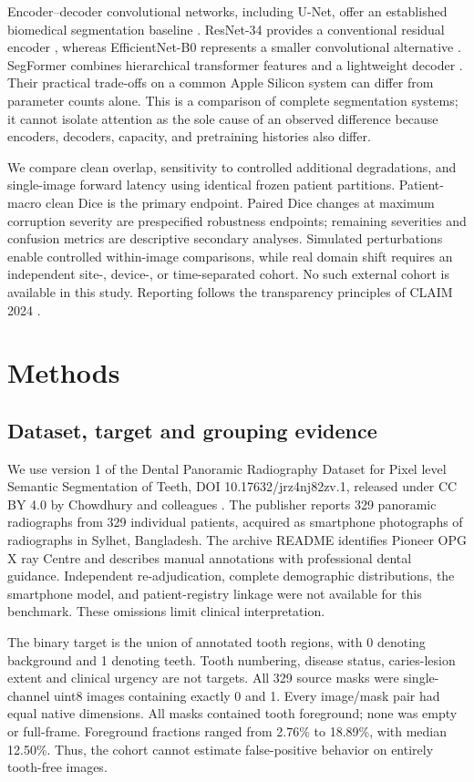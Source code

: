\documentclass[11pt]{article}
\begin{document}
Encoder--decoder convolutional networks, including U-Net, offer an established biomedical segmentation baseline \cite{unet}. ResNet-34 provides a conventional residual encoder \cite{resnet}, whereas EfficientNet-B0 represents a smaller convolutional alternative \cite{efficientnet}. SegFormer combines hierarchical transformer features and a lightweight decoder \cite{segformer}. Their practical trade-offs on a common Apple Silicon system can differ from parameter counts alone. This is a comparison of complete segmentation systems; it cannot isolate attention as the sole cause of an observed difference because encoders, decoders, capacity, and pretraining histories also differ.

We compare clean overlap, sensitivity to controlled additional degradations, and single-image forward latency using identical frozen patient partitions. Patient-macro clean Dice is the primary endpoint. Paired Dice changes at maximum corruption severity are prespecified robustness endpoints; remaining severities and confusion metrics are descriptive secondary analyses. Simulated perturbations enable controlled within-image comparisons, while real domain shift requires an independent site-, device-, or time-separated cohort. No such external cohort is available in this study. Reporting follows the transparency principles of CLAIM 2024 \cite{claim}.

\section{Methods}
\subsection{Dataset, target and grouping evidence}
We use version 1 of the Dental Panoramic Radiography Dataset for Pixel level Semantic Segmentation of Teeth, DOI 10.17632/jrz4nj82zv.1, released under CC BY 4.0 by Chowdhury and colleagues \cite{dataset}. The publisher reports 329 panoramic radiographs from 329 individual patients, acquired as smartphone photographs of radiographs in Sylhet, Bangladesh. The archive README identifies Pioneer OPG X ray Centre and describes manual annotations with professional dental guidance. Independent re-adjudication, complete demographic distributions, the smartphone model, and patient-registry linkage were not available for this benchmark. These omissions limit clinical interpretation.

The binary target is the union of annotated tooth regions, with 0 denoting background and 1 denoting teeth. Tooth numbering, disease status, caries-lesion extent and clinical urgency are not targets. All 329 source masks were single-channel uint8 images containing exactly 0 and 1. Every image/mask pair had equal native dimensions. All masks contained tooth foreground; none was empty or full-frame. Foreground fractions ranged from 2.76\% to 18.89\%, with median 12.50\%. Thus, the cohort cannot estimate false-positive behavior on entirely tooth-free images.
\end{document}
